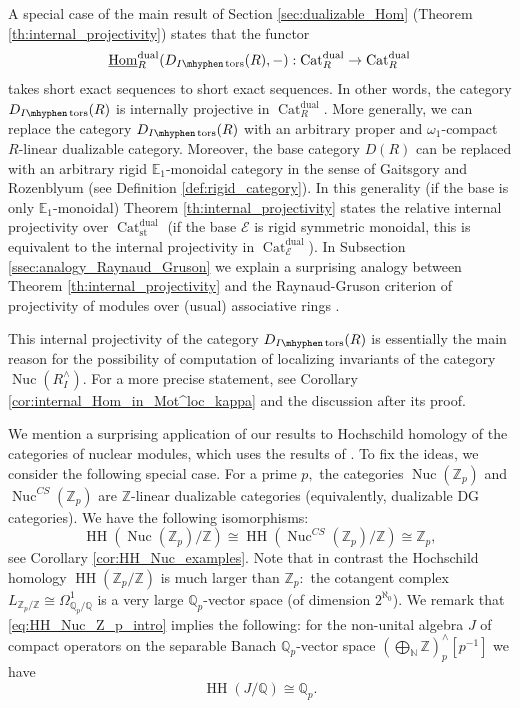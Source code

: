 \documentclass[11pt,leqno]{amsart}
\numberwithin{equation}{section}
\def\N{\mathbb{N}}
\def\Z{\mathbb{Z}}
\def\Q{\mathbb{Q}}
\def\Hom{\operatorname{Hom}}
\newcommand{\hy}{\mhyphen}
\newcommand{\biggplus}[1][]{\mathop{\bigoplus}\limits_{#1}}
\newcommand{\Nuc}{\operatorname{Nuc}}
\newcommand{\Cat}{\operatorname{Cat}}
\newcommand{\st}{\operatorname{st}}
\newcommand{\dual}{\operatorname{dual}}
\newcommand{\bE}{{\mathbb E}}
\newcommand{\cE}{{\mathcal E}}
\newcommand{\un}{\underline}
\newcommand{\HH}{\operatorname{HH}}
\newcommand{\tors}{\operatorname{tors}}
\begin{document}
A special case of the main result of Section \ref{sec:dualizable_Hom} (Theorem \ref{th:internal_projectivity}) states that the
functor
\begin{equation*}
\un{\Hom}_R^{\dual}(D_{I\hy\tors}(R),-):\Cat_R^{\dual}\to \Cat_R^{\dual}
\end{equation*}
takes short exact sequences to short exact sequences. In other words, the category $D_{I\hy\tors}(R)$ is internally projective in $\Cat_R^{\dual}.$ More generally, we can replace the category $D_{I\hy\tors}(R)$ with an arbitrary proper and $\omega_1$-compact $R$-linear dualizable category. Moreover, the base category $D(R)$ can be replaced with an arbitrary rigid $\bE_1$-monoidal category in the sense of Gaitsgory and Rozenblyum (see Definition \ref{def:rigid_category}). In this generality (if the base is only $\bE_1$-monoidal) Theorem \ref{th:internal_projectivity} states the relative internal projectivity over $\Cat_{\st}^{\dual}$ (if the base $\cE$ is rigid symmetric monoidal, this is equivalent to the internal projectivity in $\Cat_{\cE}^{\dual}$). In Subsection \ref{ssec:analogy_Raynaud_Gruson} we explain a surprising analogy between Theorem \ref{th:internal_projectivity} and the Raynaud-Gruson criterion of projectivity of modules over (usual) associative rings \cite{RayGru}.

This internal projectivity of the category $D_{I\hy\tors}(R)$ is essentially the main reason for the possibility of computation of localizing invariants of the category $\Nuc(R^{\wedge}_I).$  For a more precise statement, see Corollary \ref{cor:internal_Hom_in_Mot^loc_kappa} and the discussion after its proof.

We mention a surprising application of our results to Hochschild homology of the categories of nuclear modules, which uses the results of \cite{Cor}. To fix the ideas, we consider the following special case. For a prime $p,$ the categories $\Nuc(\Z_p)$ and $\Nuc^{CS}(\Z_p)$ are $\Z$-linear dualizable categories (equivalently, dualizable DG categories). We have the following isomorphisms:
\begin{equation}\label{eq:HH_Nuc_Z_p_intro}
\HH(\Nuc(\Z_p)/\Z)\cong\HH(\Nuc^{CS}(\Z_p)/\Z)\cong \Z_p,
\end{equation}
see Corollary \ref{cor:HH_Nuc_examples}. Note that in contrast the Hochschild homology $\HH(\Z_p/\Z)$ is much larger than $\Z_p:$ the cotangent complex $L_{\Z_p/\Z}\cong \Omega^1_{\Q_p/\Q}$ is a very large $\Q_p$-vector space (of dimension $2^{\aleph_0}$). We remark that \eqref{eq:HH_Nuc_Z_p_intro} implies the following: for the non-unital algebra $J$ of compact operators on the separable Banach $\Q_p$-vector space $(\biggplus[\N]\Z)^{\wedge}_p [p^{-1}]$ we have
\begin{equation*}
\HH(J/\Q)\cong \Q_p.
\end{equation*}
\end{document}

